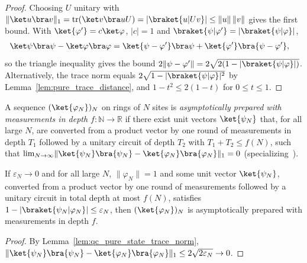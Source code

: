 \begin{proof}\leanok
    Choosing $U$ unitary with
    $\lVert\ket u\bra v\rVert_1=\operatorname{tr}(\ket v\bra u U)
        =\lvert\braket{u|Uv}\rvert\leq\lVert u\rVert\,\lVert v\rVert$ gives the
    first bound. With $\ket{\varphi'}=c\ket\varphi$, $\lvert c\rvert=1$ and
    $\braket{\psi|\varphi'}=\lvert\braket{\psi|\varphi}\rvert$,
    \begin{align}
        \ket\psi\bra\psi-\ket\varphi\bra\varphi
         & =\ket{\psi-\varphi'}\bra\psi+\ket{\varphi'}\bra{\psi-\varphi'},\notag
    \end{align}
    so the triangle inequality gives the bound
    $2\lVert\psi-\varphi'\rVert=2\sqrt{2(1-\lvert\braket{\psi|\varphi}\rvert)}$.
    Alternatively, the trace norm equals
    $2\sqrt{1-\lvert\braket{\psi|\varphi}\rvert^2}$ by
    Lemma~\ref{lem:pure_trace_distance}, and $1-t^2\leq2(1-t)$ for
    $0\leq t\leq1$.
\end{proof}

\begin{definition}
    \label{def:qc_asymptotic_measurement_preparation}
    \leanok
    A sequence $(\ket{\varphi_N})_N$ on rings of $N$ sites is
    \emph{asymptotically prepared with measurements in depth
        $f\colon\mathbb N\to\mathbb R$} if there exist unit vectors
    $\ket{\psi_N}$ that, for all large $N$, are converted from a product vector
    by one round of measurements in depth $T_1$ followed by a unitary circuit of
    depth $T_2$ with $T_1+T_2\leq f(N)$, such that
    $\lim_{N\to\infty}\lVert\ket{\psi_N}\bra{\psi_N}
        -\ket{\varphi_N}\bra{\varphi_N}\rVert_1=0$ (specializing~\cite[paragraph
        ``Phases of matter'']{Piroli2021LOCC}).
\end{definition}

\begin{lemma}
    \label{lem:qc_asymptotic_preparation_of_overlap}
    \leanok
    If $\varepsilon_N\to0$ and for all large $N$, $\lVert\varphi_N\rVert=1$ and
    some unit vector $\ket{\psi_N}$, converted from a product vector by one round
    of measurements followed by a unitary circuit in total depth at most $f(N)$,
    satisfies $1-\lvert\braket{\psi_N|\varphi_N}\rvert\leq\varepsilon_N$, then
    $(\ket{\varphi_N})_N$ is asymptotically prepared with measurements in depth
    $f$.
\end{lemma}

\begin{proof}\leanok
    By Lemma~\ref{lem:qc_pure_state_trace_norm},
    $\lVert\ket{\psi_N}\bra{\psi_N}-\ket{\varphi_N}\bra{\varphi_N}\rVert_1
        \leq2\sqrt{2\varepsilon_N}\to0$.
\end{proof}
